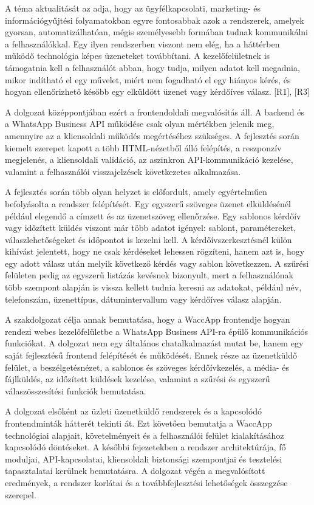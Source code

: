 A téma aktualitását az adja, hogy az ügyfélkapcsolati, marketing- és információgyűjtési folyamatokban egyre fontosabbak azok a rendszerek, amelyek gyorsan, automatizálhatóan, mégis személyesebb formában tudnak kommunikálni a felhasználókkal. Egy ilyen rendszerben viszont nem elég, ha a háttérben működő technológia képes üzeneteket továbbítani. A kezelőfelületnek is támogatnia kell a felhasználót abban, hogy tudja, milyen adatot kell megadnia, mikor indítható el egy művelet, miért nem fogadható el egy hiányos kérés, és hogyan ellenőrizhető később egy elküldött üzenet vagy kérdőíves válasz. [R1], [R3] 

A dolgozat középpontjában ezért a frontendoldali megvalósítás áll. A backend és a WhatsApp Business API működése csak olyan mértékben jelenik meg, amennyire az a kliensoldali működés megértéséhez szükséges. A fejlesztés során kiemelt szerepet kapott a több HTML-nézetből álló felépítés, a reszponzív megjelenés, a kliensoldali validáció, az aszinkron API-kommunikáció kezelése, valamint a felhasználói visszajelzések következetes alkalmazása. 

A fejlesztés során több olyan helyzet is előfordult, amely egyértelműen befolyásolta a rendszer felépítését. Egy egyszerű szöveges üzenet elküldésénél például elegendő a címzett és az üzenetszöveg ellenőrzése. Egy sablonos kérdőív vagy időzített küldés viszont már több adatot igényel: sablont, paramétereket, válaszlehetőségeket és időpontot is kezelni kell. A kérdőívszerkesztésnél külön kihívást jelentett, hogy ne csak kérdéseket lehessen rögzíteni, hanem azt is, hogy egy adott válasz után melyik következő kérdés vagy sablon következzen. A szűrési felületen pedig az egyszerű listázás kevésnek bizonyult, mert a felhasználónak több szempont alapján is vissza kellett tudnia keresni az adatokat, például név, telefonszám, üzenettípus, dátumintervallum vagy kérdőíves válasz alapján. 

A szakdolgozat célja annak bemutatása, hogy a WaccApp frontendje hogyan rendezi webes kezelőfelületbe a WhatsApp Business API-ra épülő kommunikációs funkciókat. A dolgozat nem egy általános chatalkalmazást mutat be, hanem egy saját fejlesztésű frontend felépítését és működését. Ennek része az üzenetküldő felület, a beszélgetésnézet, a sablonos és szöveges kérdőívkezelés, a média- és fájlküldés, az időzített küldések kezelése, valamint a szűrési és egyszerű válaszösszesítési funkciók bemutatása.

A dolgozat elsőként az üzleti üzenetküldő rendszerek és a kapcsolódó frontendminták hátterét tekinti át. Ezt követően bemutatja a WaccApp technológiai alapjait, követelményeit és a felhasználói felület kialakításához kapcsolódó döntéseket. A későbbi fejezetekben a rendszer architektúrája, fő moduljai, API-kapcsolatai, kliensoldali biztonsági szempontjai és tesztelési tapasztalatai kerülnek bemutatásra. A dolgozat végén a megvalósított eredmények, a rendszer korlátai és a továbbfejlesztési lehetőségek összegzése szerepel. 
